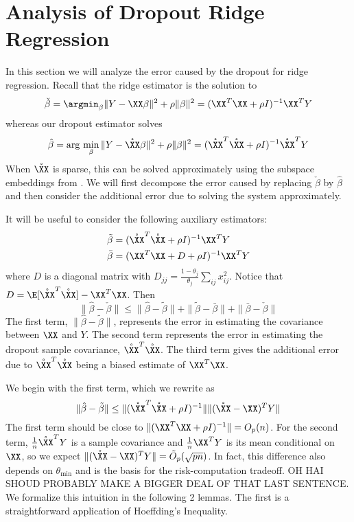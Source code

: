 \section{Analysis of Dropout Ridge Regression}
\label{sec:ridgeanalysis}
In this section we will analyze the error caused by the dropout for ridge regression. Recall that the ridge estimator is the solution to
\begin{equation}
\check{\beta} = \argmin_{\beta} \| Y - \XX \beta \|^2 + \rho \| \beta \|^2 = (\XX^T \XX + \rho I)^{-1} \XX^T Y
\end{equation}
whereas our dropout estimator solves
\begin{equation}
\hat{\beta} = \arg\,\min_{\beta} \| Y - \mathring{\XX} \beta \|^2 + \rho \| \beta \|^2 = (\mathring{\XX}^T \mathring{\XX} + \rho I)^{-1} \mathring{\XX}^T Y
\end{equation}
When $\mathring{\XX}$ is sparse, this can be solved approximately using the subspace embeddings from \cite{Clarkson:2012, Nelson:2012}.
We will first decompose the error caused by replacing $\check{\beta}$ by $\hat{\beta}$ and then consider the additional error due to solving the system approximately.

It will be useful to consider the following auxiliary estimators:
\begin{align}
\tilde{\beta} &= (\mathring{\XX}^T \mathring{\XX} + \rho I)^{-1} \XX^T Y \\
\bar{\beta} &= (\XX^T \XX + D + \rho I)^{-1} \XX^T Y
\end{align}
where $D$ is a diagonal matrix with $D_{jj} = \frac{1-\theta_j}{\theta_j} \sum_{ij} x_{ij}^2$. Notice that $D = \E[\mathring{\XX}^T \mathring{\XX}] - \XX^T \XX$. Then
\begin{equation}
\| \hat{\beta} - \check{\beta} \| \leq \| \hat{\beta} - \tilde{\beta} \| + \| \tilde{\beta} - \bar{\beta} \| + \| \bar{\beta} - \check{\beta} \|
\end{equation}
The first term, $\| \hat{\beta} - \tilde{\beta} \| $, represents the error in estimating the covariance between $\XX$ and $Y$. The second term represents the error in estimating the dropout sample covariance, $\mathring{\XX}^T \mathring{\XX}$. The third term gives the additional error due to $\mathring{\XX}^T \mathring{\XX}$ being a biased estimate of $\XX^T \XX$.

We begin with the first term, which we rewrite as
\begin{equation}
\| \hat{\beta} - \tilde{\beta} \|  \leq \| (\mathring{\XX}^T \mathring{\XX} + \rho I)^{-1}  \| \| (\mathring{\XX} - \XX)^T Y \|
\end{equation}
The first term should be close to $\| (\XX^T \XX + \rho I )^{-1} \| = O_p(n)$. For the second term, $\frac{1}{n}\mathring{\XX}^T Y$ is a sample covariance and $\frac{1}{n} \XX^T Y$ is its mean conditional on $\XX$, so we expect $\| (\mathring{\XX} - \XX)^T Y \| = \tilde{O}_p (\sqrt{p n})$. In fact, this difference also depends on $\theta_{\min}$ and is the basis for the risk-computation tradeoff. 	OH HAI SHOUD PROBABLY MAKE A BIGGER DEAL OF THAT LAST SENTENCE. We formalize this intuition in the following 2 lemmas. The first is a straightforward application of Hoeffding's Inequality.

